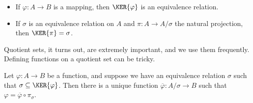 \documentclass{article}
\begin{document}
\begin{thm} \mbox{}
\begin{itemize}
\item If $\varphi : A \rightarrow B$ is a mapping, then $\KER{\varphi}$ is an equivalence relation.
\item If $\sigma$ is an equivalence relation on $A$ and $\pi : A \rightarrow A/\sigma$ the natural projection, then $\KER{\pi} = \sigma$.
\end{itemize}
\end{thm}

Quotient sets, it turns out, are extremely important, and we use them frequently. Defining functions on a quotient set can be tricky.

\begin{thm}
Let $\varphi : A \rightarrow B$ be a function, and suppose we have an equivalence relation $\sigma$ such that $\sigma \subseteq \KER{\varphi}$. Then there is a unique function $\overline{\varphi} : A/\sigma \rightarrow B$ such that $\varphi = \overline{\varphi} \circ \pi_{\sigma}$.
\end{thm}
\end{document}
